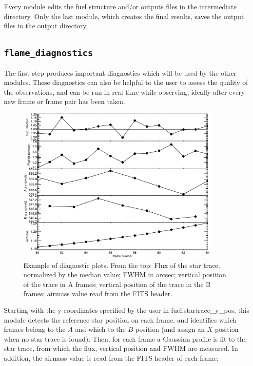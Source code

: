 \documentclass[a4paper, notitlepage]{article}
\begin{document}
Every module edits the fuel structure and/or outputs files in the intermediate directory. Only the last module, which creates the final results, saves the output files in the output directory.



\subsection{\texttt{flame\_diagnostics}}
\label{sec:diagnostics}

The first step produces important diagnostics which will be used by the other modules. These diagnostics can also be helpful to the user to assess the quality of the observations, and can be run in real time while observing, ideally after every new frame or frame pair has been taken.

\begin{figure}[htbp]
\centering
\includegraphics[width=0.9\textwidth]{diagnostics}
\caption{Example of diagnostic plots. From the top: Flux of the star trace, normalized by the median value; FWHM in arcsec; vertical position of the trace in A frames; vertical position of the trace in the B frames; airmass value read from the FITS header.}
\label{fig:diagnostics}
\end{figure}

Starting with the y coordinates specified by the user in fuel.startrace\_y\_pos, this module detects the reference star position on each frame, and identifies which frames belong to the $A$ and which to the $B$ position (and assign an $X$ position when no star trace is found). Then, for each frame a Gaussian profile is fit to the star trace, from which the flux, vertical position and FWHM are measured. In addition, the airmass value is read from the FITS header of each frame.
\end{document}
